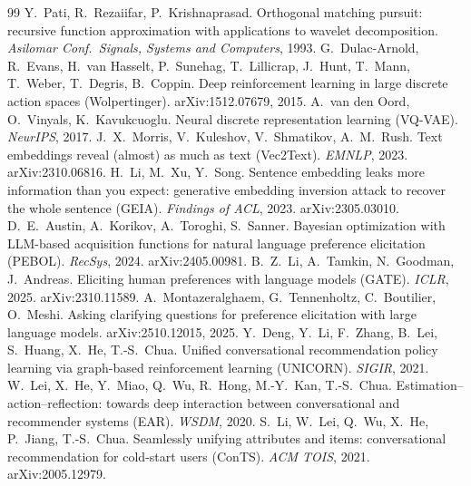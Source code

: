 \documentclass[11pt]{article}
\begin{document}

\begin{thebibliography}{99}
 Y.~Pati, R.~Rezaiifar, P.~Krishnaprasad. Orthogonal matching pursuit: recursive function approximation with applications to wavelet decomposition. \emph{Asilomar Conf.\ Signals, Systems and Computers}, 1993.
 G.~Dulac-Arnold, R.~Evans, H.~van Hasselt, P.~Sunehag, T.~Lillicrap, J.~Hunt, T.~Mann, T.~Weber, T.~Degris, B.~Coppin. Deep reinforcement learning in large discrete action spaces (Wolpertinger). arXiv:1512.07679, 2015.
 A.~van den Oord, O.~Vinyals, K.~Kavukcuoglu. Neural discrete representation learning (VQ-VAE). \emph{NeurIPS}, 2017.
 J.~X.~Morris, V.~Kuleshov, V.~Shmatikov, A.~M.~Rush. Text embeddings reveal (almost) as much as text (Vec2Text). \emph{EMNLP}, 2023. arXiv:2310.06816.
 H.~Li, M.~Xu, Y.~Song. Sentence embedding leaks more information than you expect: generative embedding inversion attack to recover the whole sentence (GEIA). \emph{Findings of ACL}, 2023. arXiv:2305.03010.
 D.~E.~Austin, A.~Korikov, A.~Toroghi, S.~Sanner. Bayesian optimization with LLM-based acquisition functions for natural language preference elicitation (PEBOL). \emph{RecSys}, 2024. arXiv:2405.00981.
 B.~Z.~Li, A.~Tamkin, N.~Goodman, J.~Andreas. Eliciting human preferences with language models (GATE). \emph{ICLR}, 2025. arXiv:2310.11589.
 A.~Montazeralghaem, G.~Tennenholtz, C.~Boutilier, O.~Meshi. Asking clarifying questions for preference elicitation with large language models. arXiv:2510.12015, 2025.
 Y.~Deng, Y.~Li, F.~Zhang, B.~Lei, S.~Huang, X.~He, T.-S.~Chua. Unified conversational recommendation policy learning via graph-based reinforcement learning (UNICORN). \emph{SIGIR}, 2021.
 W.~Lei, X.~He, Y.~Miao, Q.~Wu, R.~Hong, M.-Y.~Kan, T.-S.~Chua. Estimation--action--reflection: towards deep interaction between conversational and recommender systems (EAR). \emph{WSDM}, 2020.
 S.~Li, W.~Lei, Q.~Wu, X.~He, P.~Jiang, T.-S.~Chua. Seamlessly unifying attributes and items: conversational recommendation for cold-start users (ConTS). \emph{ACM TOIS}, 2021. arXiv:2005.12979.
\end{thebibliography}
\end{document}
